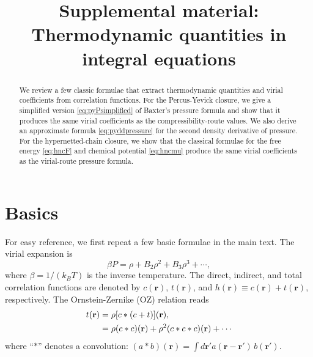 \documentclass[aip,jcp,reprint,superscriptaddress]{revtex4-1}
\newcommand{\vct}[1]{\mathbf{#1}}
\providecommand{\vr}{} %
\renewcommand{\vr}{\vct{r}}
\begin{document}
\title{Supplemental material: Thermodynamic quantities in integral equations}

\begin{abstract}
We review a few classic formulae that extract thermodynamic quantities
  and virial coefficients from correlation functions.
%
For the Percus-Yevick closure,
  we give a simplified version \eqref{eq:pyPsimplified}
  of Baxter's pressure formula
  and show that it produces the same virial coefficients
  as the compressibility-route values.
%
We also derive an approximate formula \eqref{eq:pyddpressure}
  for the second density derivative of pressure.
%
For the hypernetted-chain closure,
  we show that the classical formulae
  for the free energy \eqref{eq:hncF}
  and chemical potential \eqref{eq:hncmu}
  produce the same virial coefficients
  as the virial-route pressure formula.
\end{abstract}

\maketitle






\section{Basics}

For easy reference,
we first repeat a few basic formulae in the main text.
%
The virial expansion is
%
\begin{equation}
  \beta P = \rho + B_2 \rho^2 + B_3 \rho^3 + \cdots,
\label{eq:virial}
\end{equation}
%
where $\beta = 1/(k_B T)$ is the inverse temperature.
%
The direct, indirect, and total correlation functions
  are denoted by $c(\vr)$, $t(\vr)$,
  and $h(\vr) \equiv c(\vr) + t(\vr)$,
  respectively.
%
The Ornstein-Zernike (OZ) relation\cite{hansen} reads
%
\begin{align}
  t(\vr) &= \rho [c * (c + t)](\vr), \notag \\
         &= \rho (c*c)(\vr) + \rho^2 (c*c*c)(\vr) + \cdots
\label{eq:oz}
\end{align}
%
where ``$*$'' denotes a convolution:
  $(a * b)(\vr) = \int d\vr' a(\vr - \vr') \, b(\vr')$.
%
\end{document}
